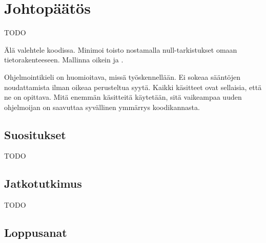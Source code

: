 \vspace{21.5pt}
\chapter{Johtopäätös}
TODO

Älä valehtele koodissa. Minimoi toisto nostamalla null-tarkistukset omaan tietorakenteeseen.
Mallinna oikein ja .

Ohjelmointikieli on huomioitava, missä työskennellään. Ei sokeaa sääntöjen noudattamista ilman oikeaa perusteltua syytä. Kaikki käsitteet ovat sellaisia, että ne on opittava. Mitä enemmän käsitteitä käytetään, sitä vaikeampaa uuden ohjelmoijan on saavuttaa syvällinen ymmärrys koodikannasta.

\section{Suositukset}

TODO


\section{Jatkotutkimus}

TODO

\section{Loppusanat}


